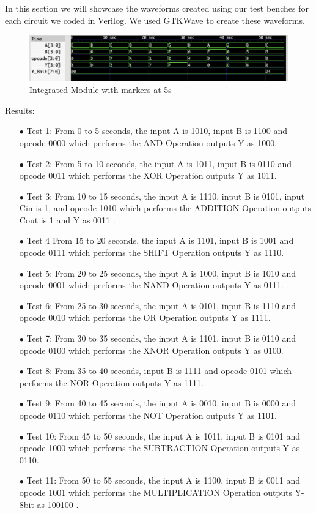 \documentclass[12pt]{article}
\begin{document}
In this section we will showcase the waveforms created using our test benches for each circuit we coded in Verilog. We used GTKWave to create these waveforms.

\begin{figure}[h]
    \centering
    \includegraphics[width = 1.2\textwidth]{../ModuleGTKwave.jpeg}
    \caption{Integrated Module with markers at 5s}
    \label{fig:enter-label}
\end{figure}

Results:
\begin{itemize}
     \item[$\bullet$ ]Test 1: From 0 to 5 seconds, the input A is 1010, input B is 1100 and opcode 0000 which performs the AND Operation outputs Y as 1000. 
     \item[$\bullet$ ]Test 2: From 5 to 10 seconds, the input A is 1011, input B is 0110 and opcode 0011 which performs the XOR Operation outputs Y as 1011.
     \item[$\bullet$ ]Test 3: From 10 to 15 seconds, the input A is 1110, input B is 0101, input Cin is 1, and opcode 1010 which performs the ADDITION Operation outputs Cout is 1 and Y as 0011 .
     \item[$\bullet$ ]Test 4 From 15 to 20 seconds, the input A is 1101, input B is 1001 and opcode 0111 which performs the SHIFT Operation outputs Y as 1110.
     \item[$\bullet$ ]Test 5: From 20 to 25 seconds, the input A is 1000, input B is 1010 and opcode 0001 which performs the NAND Operation outputs Y as 0111.
     \item[$\bullet$ ]Test 6: From 25 to 30 seconds, the input A is 0101, input B is 1110 and opcode 0010 which performs the OR Operation outputs Y as 1111.
     \item[$\bullet$ ]Test 7: From 30 to 35 seconds, the input A is 1101, input B is 0110 and opcode 0100 which performs the XNOR Operation outputs Y as 0100.
     \item[$\bullet$ ]Test 8: From 35 to 40 seconds,  input B is 1111 and opcode 0101 which performs the NOR Operation outputs Y as 1111.
     \item[$\bullet$ ]Test 9: From 40 to 45 seconds, the input A is 0010, input B is 0000 and opcode 0110 which performs the NOT Operation outputs Y as 1101.
     \item[$\bullet$ ]Test 10: From 45 to 50 seconds, the input A is 1011, input B is 0101 and opcode 1000 which performs the SUBTRACTION Operation outputs Y as 0110.
     \item[$\bullet$ ]Test 11: From 50 to 55 seconds, the input A is 1100, input B is 0011 and opcode 1001 which performs the MULTIPLICATION Operation outputs Y-8bit as 100100 .
\end{itemize}
\end{document}
